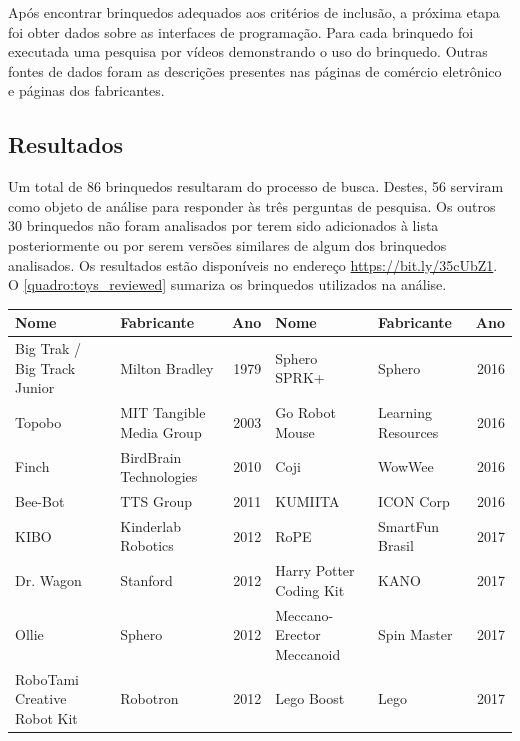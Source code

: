 {Após encontrar brinquedos adequados aos critérios de inclusão, a próxima etapa foi obter dados sobre as interfaces de programação. Para cada brinquedo foi executada uma pesquisa por vídeos demonstrando o uso do brinquedo. Outras fontes de dados foram as descrições presentes nas páginas de comércio eletrônico e páginas dos fabricantes.

\subsection{Resultados}
Um total de 86 brinquedos resultaram do processo de busca. Destes, 56 serviram como objeto de análise para responder às três perguntas de pesquisa. Os outros 30 brinquedos não foram analisados por terem sido adicionados à lista posteriormente ou por serem versões similares de algum dos brinquedos analisados. Os resultados estão disponíveis no endereço \url{https://bit.ly/35cUbZ1}. O \autoref{quadro:toys_reviewed} sumariza os brinquedos utilizados na análise.
\begin{landscape}
\linespread{1}
\begin{quadro}
 \label{quadro:toys_reviewed}
\end{quadro}
\begin{small}
\begin{longtable}{|p{4.5cm} p{4.5cm} r| p{4.5cm} p{4.5cm} r|}
    \hline
    Nome & Fabricante & Ano & Nome & Fabricante & Ano \\ \hline
    Big Trak / Big Track Junior & Milton Bradley & 1979 &
    Sphero SPRK+ & Sphero & 2016 \\ \hline
    Topobo & MIT Tangible Media Group & 2003 &
    Go Robot Mouse & Learning Resources & 2016 \\ \hline
    Finch & BirdBrain Technologies & 2010 &
    Coji & WowWee & 2016 \\ \hline
    Bee-Bot & TTS Group & 2011 &
    KUMIITA & ICON Corp & 2016 \\ \hline
    KIBO & Kinderlab Robotics & 2012 &
    RoPE & SmartFun Brasil & 2017 \\ \hline
    Dr. Wagon & Stanford & 2012 &
    Harry Potter Coding Kit & KANO & 2017 \\ \hline
    Ollie & Sphero & 2012 &
    Meccano-Erector Meccanoid & Spin Master & 2017 \\ \hline
    RoboTami Creative Robot Kit & Robotron & 2012 &
    Lego Boost & Lego & 2017 \\ \hline

\end{longtable}
\end{small}
\end{landscape}}
